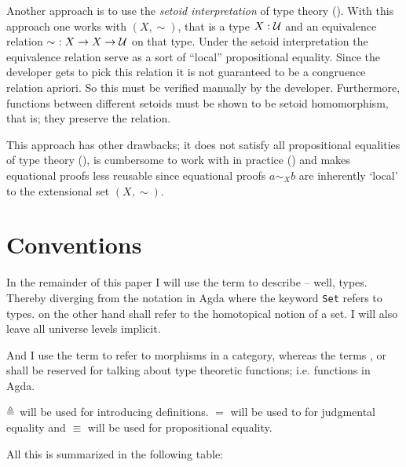 Another approach is to use the \emph{setoid interpretation} of type
theory (\cite{hofmann-1995,huber-2016}). With this approach one works
with
 $(X, \sim)$, that is a type $X \mathrel{:} \mathcal{U}$
and an equivalence relation $\sim\ \mathrel{:} X \to X \to \mathcal{U}$ on that type.
Under the setoid interpretation the equivalence relation serve as a
sort of ``local'' propositional equality. Since the developer gets to
pick this relation it is not guaranteed to be a congruence relation
apriori. So this must be verified manually by the developer.
Furthermore, functions between different setoids must be shown to be
setoid homomorphism, that is; they preserve the relation.

This approach has other drawbacks; it does not satisfy
all propositional equalities of type theory (), is
cumbersome to work with in practice (\cite[p. 4]{huber-2016}) and makes
equational proofs less reusable since equational proofs $a \sim_{X} b$ are
inherently `local' to the extensional set $(X , \sim)$.

\section{Conventions}

In the remainder of this paper I will use the term
 to describe --
well, types. Thereby diverging from the notation in Agda where the keyword
\texttt{Set} refers to types.
 on the other hand shall refer to the
homotopical notion of a set. I will also leave all universe levels implicit.

And I use the term
 to refer to morphisms in a category,
whereas the terms
,
 or
shall be reserved for talking about type theoretic functions; i.e.
functions in Agda.

$\mathrel{\triangleq}$ will be used for introducing definitions. $=$ will be used to for
judgmental equality and $\equiv$ will be used for propositional equality.

All this is summarized in the following table:

